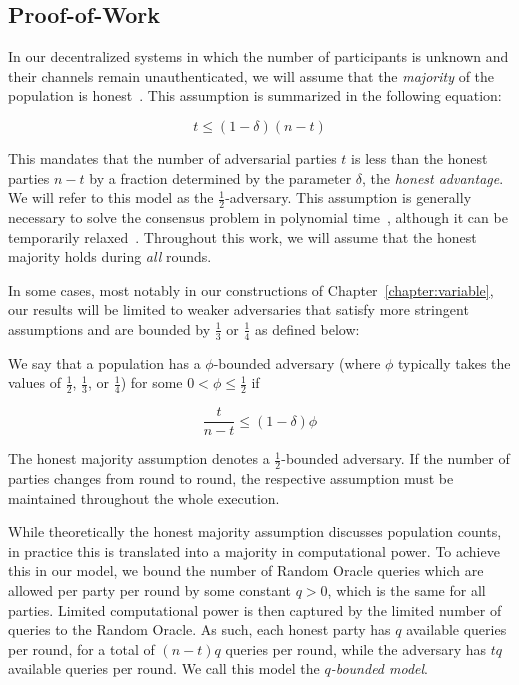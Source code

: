 \subsection{Proof-of-Work}
In our decentralized systems in which the number of participants is unknown and
their channels remain unauthenticated, we will assume that the \emph{majority}
of the population is honest~\cite{backbone}. This assumption is summarized in
the following equation:


\[
t \leq (1 - \delta)(n - t)
\]

This mandates that the number of adversarial parties $t$ is less than the honest
parties $n - t$ by a fraction determined by the parameter $\delta$, the
\emph{honest advantage}. We will refer to
this model as the $\frac{1}{2}$-adversary. This assumption is generally
necessary to solve the consensus problem in polynomial time~\cite{okun},
although it can be temporarily relaxed~\cite{dishonest}. Throughout this
work, we will assume that the honest majority holds during \emph{all} rounds.

In some cases, most notably in our constructions of
Chapter~\ref{chapter:variable}, our results will be limited to weaker
adversaries that satisfy more stringent assumptions and are bounded by
$\frac{1}{3}$ or $\frac{1}{4}$ as defined below:

\begin{definition}
  We say that a population has a $\phi$-bounded adversary (where $\phi$
  typically takes the values of $\frac{1}{2}$, $\frac{1}{3}$, or $\frac{1}{4}$)
  for some $0 < \phi \leq \frac{1}{2}$ if

  \[
  \frac{t}{n - t} \leq (1 - \delta)\phi
  \]
\end{definition}

The honest majority assumption denotes a $\frac{1}{2}$-bounded adversary. If the
number of parties changes from round to round, the respective assumption must be
maintained throughout the whole execution.

While theoretically the honest majority assumption discusses population counts,
in practice this is translated into a majority in computational power. To
achieve this in our model, we bound the number of Random Oracle queries which
are allowed per party per round by some constant $q > 0$, which is the same for all
parties. Limited computational power is then captured by the limited number of
queries to the Random Oracle. As such, each honest party has $q$ available
queries per round, for a total of $(n - t)q$ queries per round, while the
adversary has $tq$ available queries per round. We call this model the
\emph{$q$-bounded model}.

